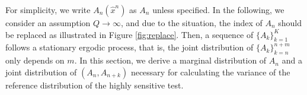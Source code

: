 \documentclass[dvipdfmx,english]{ampmt} %
\begin{document}
For simplicity, we write $A_n(\hat{x}^n)$ as $A_n$ unless specified.
In the following, we consider an assumption $Q\to\infty$, and due to the situation, the index of $A_n$ should be replaced as illustrated in Figure \ref{fig:replace}. Then, a sequence of $\{A_k\}_{k=1}^{K}$ follows a stationary ergodic process, that is, the joint distribution of $\{A_k\}_{k=n}^{n+m}$ only depends on $m$.  
%
%
%
In this section, we derive a marginal distribution of $A_n$ and a joint distribution of $(A_n,A_{n+k})$ necessary for calculating the variance of the reference distribution of the highly sensitive test.
%
\end{document}
